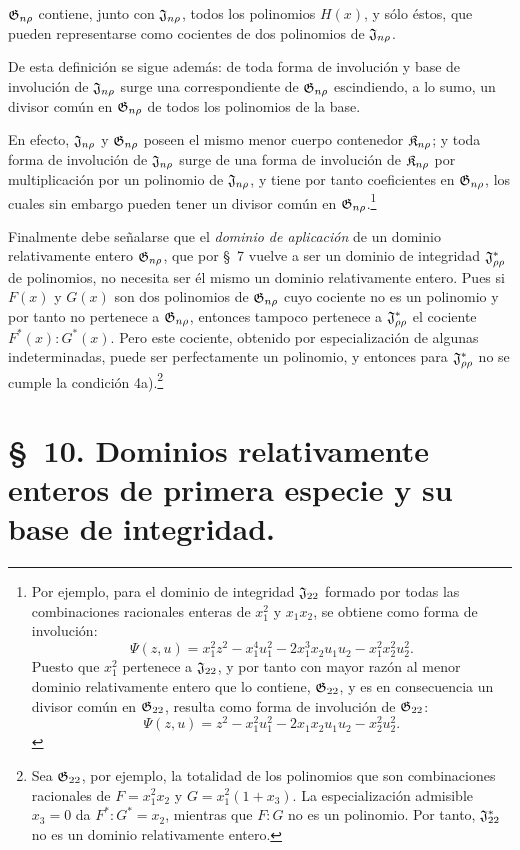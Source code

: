 \documentclass[11pt]{article}
\begin{document}
$\mathfrak{G}_{n\rho}$ contiene, junto con $\mathfrak{J}_{n\rho}$, todos los polinomios $H(x)$, y sólo éstos, que pueden representarse como cocientes de dos polinomios de $\mathfrak{J}_{n\rho}$.

De esta definición se sigue además: de toda forma de involución y base de involución de $\mathfrak{J}_{n\rho}$ surge una correspondiente de $\mathfrak{G}_{n\rho}$ escindiendo, a lo sumo, un divisor común en $\mathfrak{G}_{n\rho}$ de todos los polinomios de la base.

En efecto, $\mathfrak{J}_{n\rho}$ y $\mathfrak{G}_{n\rho}$ poseen el mismo menor cuerpo contenedor $\mathfrak{K}_{n\rho}$; y toda forma de involución de $\mathfrak{J}_{n\rho}$ surge de una forma de involución de $\mathfrak{K}_{n\rho}$ por multiplicación por un polinomio de $\mathfrak{J}_{n\rho}$, y tiene por tanto coeficientes en $\mathfrak{G}_{n\rho}$, los cuales sin embargo pueden tener un divisor común en $\mathfrak{G}_{n\rho}$.\footnote{Por ejemplo, para el dominio de integridad $\mathfrak{J}_{22}$ formado por todas las combinaciones racionales enteras de $x_1^2$ y $x_1x_2$, se obtiene como forma de involución:
\[
\Psi(z,u)=x_1^2z^2-x_1^4u_1^2-2x_1^3x_2u_1u_2-x_1^2x_2^2u_2^2.
\]
Puesto que $x_1^2$ pertenece a $\mathfrak{J}_{22}$, y por tanto con mayor razón al menor dominio relativamente entero que lo contiene, $\mathfrak{G}_{22}$, y es en consecuencia un divisor común en $\mathfrak{G}_{22}$, resulta como forma de involución de $\mathfrak{G}_{22}$:
\[
\Psi(z,u)=z^2-x_1^2u_1^2-2x_1x_2u_1u_2-x_2^2u_2^2.
\]}

Finalmente debe señalarse que el \emph{dominio de aplicación} de un dominio relativamente entero $\mathfrak{G}_{n\rho}$, que por \S\ 7 vuelve a ser un dominio de integridad $\mathfrak{J}^*_{\rho\rho}$ de polinomios, no necesita ser él mismo un dominio relativamente entero. Pues si $F(x)$ y $G(x)$ son dos polinomios de $\mathfrak{G}_{n\rho}$ cuyo cociente no es un polinomio y por tanto no pertenece a $\mathfrak{G}_{n\rho}$, entonces tampoco pertenece a $\mathfrak{J}^*_{\rho\rho}$ el cociente $F^*(x):G^*(x)$. Pero este cociente, obtenido por especialización de algunas indeterminadas, puede ser perfectamente un polinomio, y entonces para $\mathfrak{J}^*_{\rho\rho}$ no se cumple la condición 4a).\footnote{Sea $\mathfrak{G}_{22}$, por ejemplo, la totalidad de los polinomios que son combinaciones racionales de $F=x_1^2x_2$ y $G=x_1^2(1+x_3)$. La especialización admisible $x_3=0$ da $F^*:G^*=x_2$, mientras que $F:G$ no es un polinomio. Por tanto, $\mathfrak{J}^*_{22}$ no es un dominio relativamente entero.}

\section*{\S\ 10. Dominios relativamente enteros de primera especie y su base de integridad.}
\end{document}
